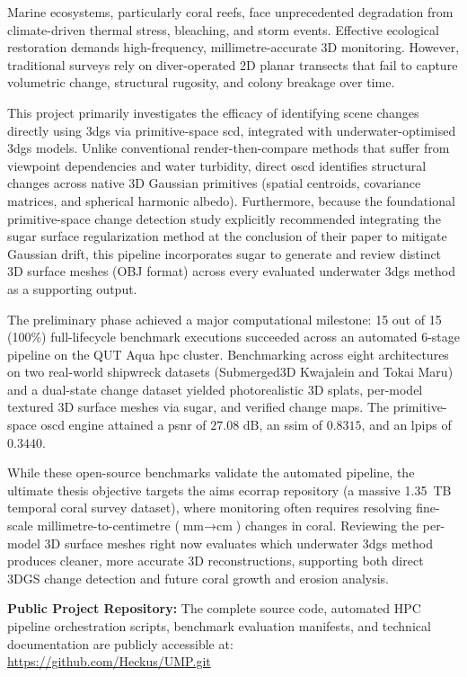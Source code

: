 
Marine ecosystems, particularly coral reefs, face unprecedented degradation from climate-driven thermal stress, bleaching, and storm events. Effective ecological restoration demands high-frequency, millimetre-accurate 3D monitoring. However, traditional surveys rely on diver-operated 2D planar transects that fail to capture volumetric change, structural rugosity, and colony breakage over time.

This project primarily investigates the efficacy of identifying scene changes directly using \gls{3dgs} via primitive-space \gls{scd}, integrated with underwater-optimised \gls{3dgs} models. Unlike conventional render-then-compare methods that suffer from viewpoint dependencies and water turbidity, direct \gls{oscd} identifies structural changes across native 3D Gaussian primitives (spatial centroids, covariance matrices, and spherical harmonic albedo). Furthermore, because the foundational primitive-space change detection study explicitly recommended integrating the \gls{sugar} surface regularization method at the conclusion of their paper to mitigate Gaussian drift, this pipeline incorporates \gls{sugar} to generate and review distinct 3D surface meshes (OBJ format) across every evaluated underwater \gls{3dgs} method as a supporting output.

The preliminary phase achieved a major computational milestone: 15 out of 15 (100\%) full-lifecycle benchmark executions succeeded across an automated 6-stage pipeline on the QUT Aqua \gls{hpc} cluster. Benchmarking across eight architectures on two real-world shipwreck datasets (Submerged3D Kwajalein and Tokai Maru) and a dual-state change dataset yielded photorealistic 3D splats, per-model textured 3D surface meshes via \gls{sugar}, and verified change maps. The primitive-space \gls{oscd} engine attained a \gls{psnr} of $27.08\text{ dB}$, an \gls{ssim} of $0.8315$, and an \gls{lpips} of $0.3440$.

While these open-source benchmarks validate the automated pipeline, the ultimate thesis objective targets the \gls{aims} \gls{ecorrap} repository (a massive 1.35~TB temporal coral survey dataset), where monitoring often requires resolving fine-scale millimetre-to-centimetre ($\text{mm} \to \text{cm}$) changes in coral. Reviewing the per-model 3D surface meshes right now evaluates which underwater \gls{3dgs} method produces cleaner, more accurate 3D reconstructions, supporting both direct 3DGS change detection and future coral growth and erosion analysis.

\vspace{1.5em}
\noindent
\textbf{Public Project Repository:} The complete source code, automated HPC pipeline orchestration scripts, benchmark evaluation manifests, and technical documentation are publicly accessible at:\\
\url{https://github.com/Heckus/UMP.git}
